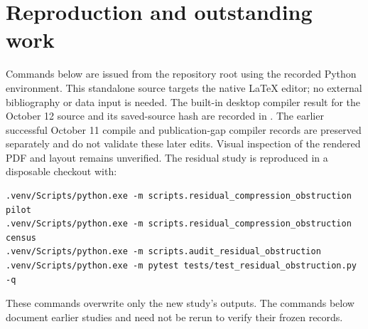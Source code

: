 \documentclass[11pt]{article}
\begin{document}
\section{Reproduction and outstanding work}
Commands below are issued from the repository root using the recorded
Python environment. This standalone source targets the native LaTeX editor;
no external bibliography or data input is needed. The built-in desktop
compiler result for the October 12 source and its saved-source hash are
recorded in .
The earlier successful October 11 compile and publication-gap compiler
records are preserved separately and do not validate these later edits.
Visual inspection of the rendered PDF and layout remains unverified.
The residual study is reproduced in a disposable checkout with:
\begin{verbatim}
.venv/Scripts/python.exe -m scripts.residual_compression_obstruction pilot
.venv/Scripts/python.exe -m scripts.residual_compression_obstruction census
.venv/Scripts/python.exe -m scripts.audit_residual_obstruction
.venv/Scripts/python.exe -m pytest tests/test_residual_obstruction.py -q
\end{verbatim}
These commands overwrite only the new study's outputs. The commands below
document earlier studies and need not be rerun to verify their frozen records.
\end{document}
